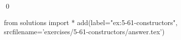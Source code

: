 
\begin{ex}
  \label{ex:5-61-constructors}
  
  \qed
\end{ex}
\begin{python0}
from solutions import *
add(label="ex:5-61-constructors",
    srcfilename='exercises/5-61-constructors/answer.tex')
\end{python0}
